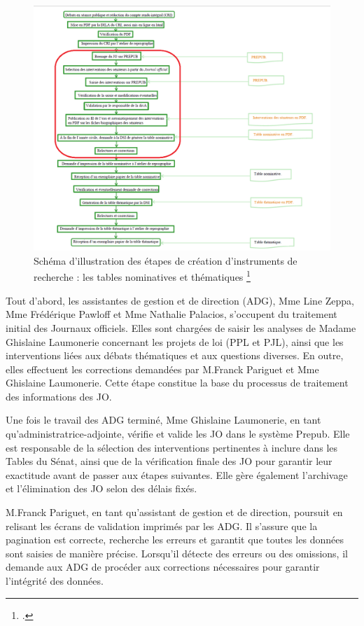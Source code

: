 \begin{figure}[H]
    \centering
    \includegraphics[width=1\textwidth]{images/Schéma de création les tables nominatives et thématiques.png}
    \caption{Schéma d'illustration des étapes de création d’instruments de recherche : les tables nominatives et thématiques \footcite{Lesdirectiondelabiblioetdesarchives}}
\end{figure}

Tout d'abord, les assistantes de gestion et de direction (ADG), Mme Line Zeppa, Mme Frédérique Pawloff et Mme Nathalie Palacios, s'occupent du traitement initial des Journaux officiels. Elles sont chargées de saisir les analyses de Madame Ghislaine Laumonerie concernant les projets de loi (PPL et PJL), ainsi que les interventions liées aux débats thématiques et aux questions diverses. En outre, elles effectuent les corrections demandées par M.Franck Pariguet et Mme Ghislaine Laumonerie. Cette étape constitue la base du processus de traitement des informations des JO.

Une fois le travail des ADG terminé, Mme Ghislaine Laumonerie, en tant qu’administratrice-adjointe, vérifie et valide les JO dans le système \gls{Prepub}. Elle est responsable de la sélection des interventions pertinentes à inclure dans les Tables du Sénat, ainsi que de la vérification finale des JO pour garantir leur exactitude avant de passer aux étapes suivantes. Elle gère également l’archivage et l’élimination des JO selon des délais fixés.

M.Franck Pariguet, en tant qu'assistant de gestion et de direction, poursuit en relisant les écrans de validation imprimés par les ADG. Il s’assure que la pagination est correcte, recherche les erreurs et garantit que toutes les données sont saisies de manière précise. Lorsqu'il détecte des erreurs ou des omissions, il demande aux ADG de procéder aux corrections nécessaires pour garantir l'intégrité des données.

